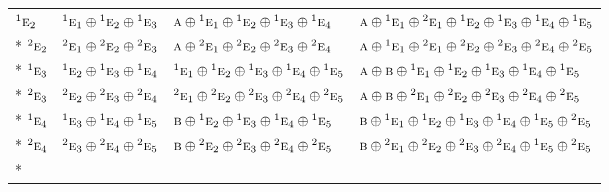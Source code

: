 \documentclass[10pt,a4paper]{article}
\numberwithin{equation}{section}
\newcommand{\irr}[1]{\text{\normalfont\scshape #1}}
\newcommand{\conjpair}[1]{{}^{#1}}
\begin{document}
{\begin{longtable}{@{}llll@{}}
$\conjpair{1}\irr{e}_{2}$ & $\conjpair{1}\irr{e}_{1}\oplus \conjpair{1}\irr{e}_{2}\oplus \conjpair{1}\irr{e}_{3}$ & $\irr{a}\oplus \conjpair{1}\irr{e}_{1}\oplus \conjpair{1}\irr{e}_{2}\oplus \conjpair{1}\irr{e}_{3}\oplus \conjpair{1}\irr{e}_{4}$ & $\irr{a}\oplus \conjpair{1}\irr{e}_{1}\oplus \conjpair{2}\irr{e}_{1}\oplus \conjpair{1}\irr{e}_{2}\oplus \conjpair{1}\irr{e}_{3}\oplus \conjpair{1}\irr{e}_{4}\oplus \conjpair{1}\irr{e}_{5}$\\*
$\conjpair{2}\irr{e}_{2}$ & $\conjpair{2}\irr{e}_{1}\oplus \conjpair{2}\irr{e}_{2}\oplus \conjpair{2}\irr{e}_{3}$ & $\irr{a}\oplus \conjpair{2}\irr{e}_{1}\oplus \conjpair{2}\irr{e}_{2}\oplus \conjpair{2}\irr{e}_{3}\oplus \conjpair{2}\irr{e}_{4}$ & $\irr{a}\oplus \conjpair{1}\irr{e}_{1}\oplus \conjpair{2}\irr{e}_{1}\oplus \conjpair{2}\irr{e}_{2}\oplus \conjpair{2}\irr{e}_{3}\oplus \conjpair{2}\irr{e}_{4}\oplus \conjpair{2}\irr{e}_{5}$\\*
$\conjpair{1}\irr{e}_{3}$ & $\conjpair{1}\irr{e}_{2}\oplus \conjpair{1}\irr{e}_{3}\oplus \conjpair{1}\irr{e}_{4}$ & $\conjpair{1}\irr{e}_{1}\oplus \conjpair{1}\irr{e}_{2}\oplus \conjpair{1}\irr{e}_{3}\oplus \conjpair{1}\irr{e}_{4}\oplus \conjpair{1}\irr{e}_{5}$ & $\irr{a}\oplus \irr{b}\oplus \conjpair{1}\irr{e}_{1}\oplus \conjpair{1}\irr{e}_{2}\oplus \conjpair{1}\irr{e}_{3}\oplus \conjpair{1}\irr{e}_{4}\oplus \conjpair{1}\irr{e}_{5}$\\*
$\conjpair{2}\irr{e}_{3}$ & $\conjpair{2}\irr{e}_{2}\oplus \conjpair{2}\irr{e}_{3}\oplus \conjpair{2}\irr{e}_{4}$ & $\conjpair{2}\irr{e}_{1}\oplus \conjpair{2}\irr{e}_{2}\oplus \conjpair{2}\irr{e}_{3}\oplus \conjpair{2}\irr{e}_{4}\oplus \conjpair{2}\irr{e}_{5}$ & $\irr{a}\oplus \irr{b}\oplus \conjpair{2}\irr{e}_{1}\oplus \conjpair{2}\irr{e}_{2}\oplus \conjpair{2}\irr{e}_{3}\oplus \conjpair{2}\irr{e}_{4}\oplus \conjpair{2}\irr{e}_{5}$\\*
$\conjpair{1}\irr{e}_{4}$ & $\conjpair{1}\irr{e}_{3}\oplus \conjpair{1}\irr{e}_{4}\oplus \conjpair{1}\irr{e}_{5}$ & $\irr{b}\oplus \conjpair{1}\irr{e}_{2}\oplus \conjpair{1}\irr{e}_{3}\oplus \conjpair{1}\irr{e}_{4}\oplus \conjpair{1}\irr{e}_{5}$ & $\irr{b}\oplus \conjpair{1}\irr{e}_{1}\oplus \conjpair{1}\irr{e}_{2}\oplus \conjpair{1}\irr{e}_{3}\oplus \conjpair{1}\irr{e}_{4}\oplus \conjpair{1}\irr{e}_{5}\oplus \conjpair{2}\irr{e}_{5}$\\*
$\conjpair{2}\irr{e}_{4}$ & $\conjpair{2}\irr{e}_{3}\oplus \conjpair{2}\irr{e}_{4}\oplus \conjpair{2}\irr{e}_{5}$ & $\irr{b}\oplus \conjpair{2}\irr{e}_{2}\oplus \conjpair{2}\irr{e}_{3}\oplus \conjpair{2}\irr{e}_{4}\oplus \conjpair{2}\irr{e}_{5}$ & $\irr{b}\oplus \conjpair{2}\irr{e}_{1}\oplus \conjpair{2}\irr{e}_{2}\oplus \conjpair{2}\irr{e}_{3}\oplus \conjpair{2}\irr{e}_{4}\oplus \conjpair{1}\irr{e}_{5}\oplus \conjpair{2}\irr{e}_{5}$\\*

\end{longtable}}
\end{document}
